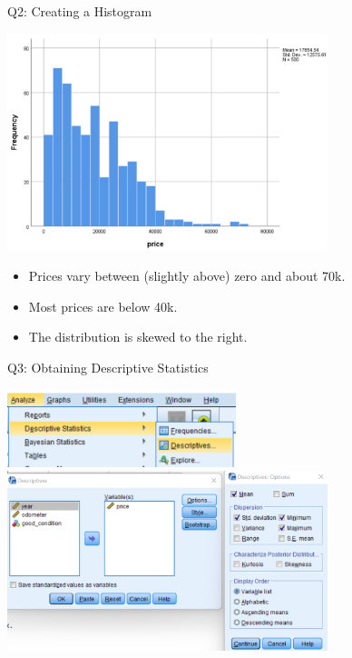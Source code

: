 \documentclass[11pt]{beamer}
\begin{document}
\begin{frame}{Q2: Creating a Histogram}
  \begin{center}
    \includegraphics[width=0.7\textwidth]{f150-histogram-price.png}
  \end{center}
  \begin{itemize}
      \item Prices vary between (slightly above) zero and about 70k.
      \item Most prices are below 40k.
      \item The distribution is skewed to the right.
  \end{itemize}
\end{frame}

\begin{frame}{Q3: Obtaining Descriptive Statistics}
  \begin{center}
    \includegraphics[width=0.5\textwidth]{f150-analyze-descriptives.png} \\
    \vspace{1cm}
    \includegraphics[width=0.7\textwidth]{f150-descriptive-options.png}
  \end{center}
\end{frame}
\end{document}
